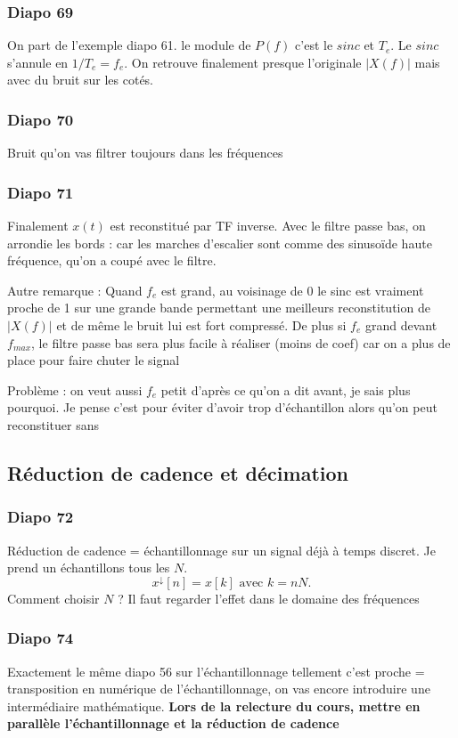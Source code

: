 \documentclass{article}
\theoremstyle{plain}%
\theoremstyle{definition}
\theoremstyle{remark}
\begin{document}
\subsubsection{Diapo 69}
On part de l'exemple diapo 61. le module de $ P(f) $ c'est le $ sinc $ et $ T_e $. Le $ sinc $ s'annule en $ 1/T_e = f_e $. On retrouve finalement presque l'originale $ |X(f)| $ mais avec du bruit sur les cotés.
\subsubsection{Diapo 70}
Bruit qu'on vas filtrer toujours dans les fréquences

\subsubsection{Diapo 71}
Finalement $ x(t) $ est reconstitué par TF inverse. Avec le filtre passe bas, on arrondie les bords : car les marches d'escalier sont comme des sinusoïde haute fréquence, qu'on a coupé avec le filtre.

Autre remarque : Quand $ f_e $ est grand, au voisinage de 0 le sinc est vraiment proche de 1 sur une grande bande permettant une meilleurs reconstitution de $ \left| X(f) \right|  $ et de même le bruit lui est fort compressé. De plus si $ f_e $ grand devant $ f_{max} $, le filtre passe bas sera plus facile à réaliser (moins de coef) car on a plus de place pour faire chuter le signal

Problème : on veut aussi $ f_e $ petit d'après ce qu'on a dit avant, je sais plus pourquoi. Je pense c'est pour éviter d'avoir trop d'échantillon alors qu'on peut reconstituer sans

\subsection{Réduction de cadence et décimation}
\subsubsection{Diapo 72}
Réduction de cadence = échantillonnage sur un signal déjà à temps discret. Je prend un échantillons tous les $ N $. 
\[
    x^{\downarrow }[n] = x[k] \text{ avec } k = nN
.\]
Comment choisir $ N $ ? Il faut regarder l'effet dans le domaine des fréquences

\subsubsection{Diapo 74}
Exactement le même diapo 56 sur l'échantillonnage tellement c'est proche = transposition en numérique de l'échantillonnage, on vas encore introduire une intermédiaire mathématique. \textbf{Lors de la relecture du cours, mettre en parallèle l'échantillonnage et la réduction de cadence}
\end{document}
